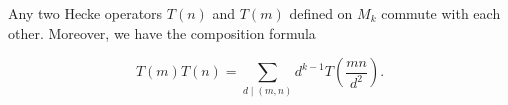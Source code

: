Any two Hecke operators $T(n)$ and $T(m)$ defined on $M_k$ commute with each other. Moreover, we have the composition formula

$$T(m)T(n) = \sum_{d \mid (m,n)} d^{k-1} T\!\left(\frac{mn}{d^2}\right).$$
